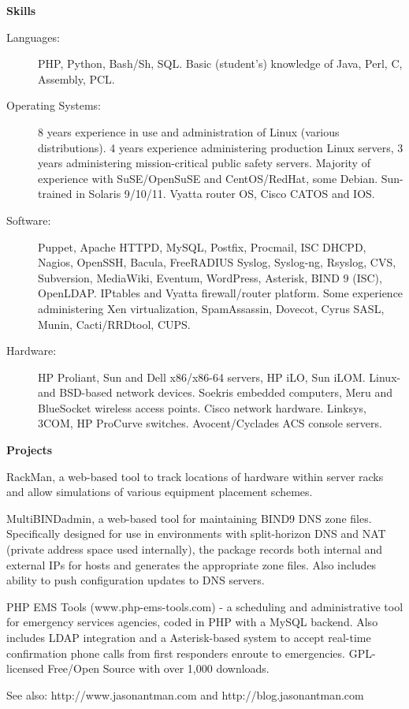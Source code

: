 \documentclass[letterpaper,11pt]{article}
\newcommand{\resheading}[1]{{\large \colorbox{mygrey}{\begin{minipage}{\textwidth}{\textbf{#1 \vphantom{p\^{E}}}}\end{minipage}}}}
\begin{document}
\resheading{Skills}

\begin{description}
\item[Languages:]
PHP, Python, Bash/Sh, SQL. Basic (student's) knowledge of Java, Perl, C,
Assembly, PCL.
\item[Operating Systems:]
8 years experience in use and administration of Linux (various
distributions). 4 years experience administering production Linux servers, 3
years administering mission-critical public safety servers. Majority of experience with SuSE/OpenSuSE and
CentOS/RedHat, some Debian. Sun-trained in Solaris 9/10/11. Vyatta router OS,
Cisco CATOS and IOS.
\item[Software:]
Puppet, Apache HTTPD, MySQL, Postfix, Procmail, ISC DHCPD, Nagios, OpenSSH,
Bacula, FreeRADIUS
Syslog, Syslog-ng, Rsyslog, CVS, Subversion, MediaWiki, Eventum, WordPress,
Asterisk, BIND 9 (ISC), OpenLDAP. IPtables and Vyatta firewall/router
platform. Some experience administering Xen virtualization, SpamAssassin,
Dovecot, Cyrus SASL, Munin, Cacti/RRDtool,  CUPS.


\item[Hardware:]
HP Proliant, Sun and Dell x86/x86-64 servers, HP iLO, Sun iLOM. Linux- and
BSD-based network devices. Soekris embedded computers, Meru and BlueSocket
wireless access points. Cisco network hardware. Linksys, 3COM, HP ProCurve
switches. Avocent/Cyclades ACS console servers.
\end{description}


\resheading{Projects}

\begin{description}
\item[In Progress:] RackMan, a web-based tool to track locations of hardware
  within server racks and allow simulations of various equipment placement
  schemes.
\item MultiBINDadmin, a web-based tool for maintaining BIND9 DNS
  zone files. Specifically designed for use in environments with split-horizon
  DNS and NAT (private address space used internally), the package records
  both internal and external IPs for hosts and generates the appropriate zone
  files. Also includes ability to push configuration updates to DNS servers.
\item[2007--Present:] PHP EMS Tools (www.php-ems-tools.com) - a scheduling and
  administrative tool for emergency services agencies, coded in PHP with a MySQL
  backend. Also includes LDAP integration and a Asterisk-based system to accept
  real-time confirmation phone calls from first responders enroute to
  emergencies. GPL-licensed Free/Open Source with over 1,000 downloads.
\item See also: http://www.jasonantman.com and http://blog.jasonantman.com

\end{description}
\end{document}
